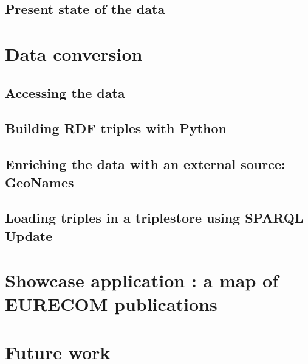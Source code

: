 \documentclass[a4paper,11pt]{report}
\begin{document}
\section{Present state of the data}



\chapter{Data conversion}
\section{Accessing the data} 
\section{Building RDF triples with Python}
\section{Enriching the data with an external source: GeoNames}
\section{Loading triples in a triplestore using SPARQL Update}



\chapter{Showcase application : a map of EURECOM publications}



\chapter{Future work}
\end{document}
